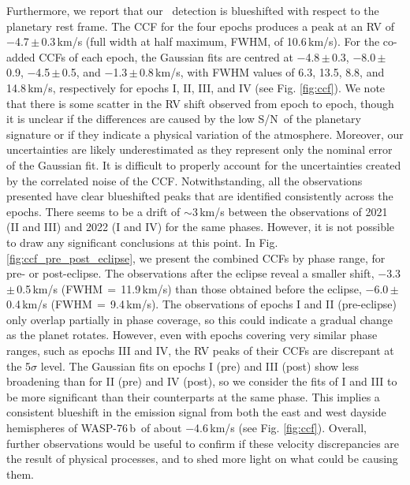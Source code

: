 \documentclass{aa}
\newcommand{\feI}{\ion{Fe}{i}}
\newcommand{\snr}{S/N}
\newcommand{\planet}{WASP-76\,b}
\begin{document}
Furthermore, we report that our \feI\ detection is blueshifted with respect to the planetary rest frame. The CCF for the four epochs produces a peak at an RV of $-$4.7\,$\pm$\,0.3\,km/s (full width at half maximum, FWHM, of 10.6\,km/s). For the co-added CCFs of each epoch, the Gaussian fits are centred at $-$4.8\,$\pm$\,0.3, $-$8.0\,$\pm$\,0.9, $-$4.5\,$\pm$\,0.5, and $-$1.3\,$\pm$\,0.8\,km/s, with FWHM values of 6.3, 13.5, 8.8, and 14.8\,km/s, respectively for epochs I, II, III, and IV (see Fig. \ref{fig:ccf}). We note that there is some scatter in the RV shift observed from epoch to epoch, though it is unclear if the differences are caused by the low \snr\ of the planetary signature or if they indicate a physical variation of the atmosphere. 
%
Moreover, our uncertainties are likely underestimated as they represent only the nominal error of the Gaussian fit. It is difficult to properly account for the uncertainties created by the correlated noise of the CCF. Notwithstanding, all the observations presented have clear blueshifted peaks that are identified consistently across the epochs.
%
There seems to be a drift of $\sim$3\,km/s between the observations of 2021 (II and III) and 2022 (I and IV) for the same phases. However, it is not possible to draw any significant conclusions at this point. 
%
In Fig. \ref{fig:ccf_pre_post_eclipse}, we present the combined CCFs by phase range, for pre- or post-eclipse. The observations after the eclipse reveal a smaller shift, $-$3.3\,$\pm$\,0.5\,km/s (FWHM\,$=$\,11.9\,km/s) than those obtained before the eclipse, $-$6.0\,$\pm$\,0.4\,km/s (FWHM\,$=$\,9.4\,km/s). The observations of epochs I and II (pre-eclipse) only overlap partially in phase coverage, so this could indicate a gradual change as the planet rotates. However, even with epochs covering very similar phase ranges, such as epochs III and IV, the RV peaks of their CCFs are discrepant at the 5$\sigma$ level. The Gaussian fits on epochs I (pre) and III (post) show less broadening than for II (pre) and IV (post), so we consider the fits of I and III to be more significant than their counterparts at the same phase. This implies a consistent blueshift in the emission signal from both the east and west dayside hemispheres of \planet\ of about $-$4.6\,km/s (see Fig. \ref{fig:ccf}). Overall, further observations would be useful to confirm if these velocity discrepancies are the result of physical processes, and to shed more light on what could be causing them.
 
\end{document}
